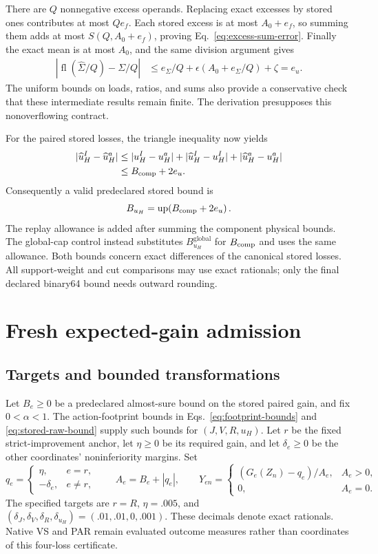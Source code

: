 \documentclass[11pt]{article}
\newcommand{\up}{\operatorname{up}}
\begin{document}
There are $Q$ nonnegative excess operands. Replacing exact excesses by stored ones contributes at most $Qe_f$. Each stored excess is at most $A_0+e_f$, so summing them adds at most $S(Q,A_0+e_f)$, proving Eq.~\eqref{eq:excess-sum-error}. Finally the exact mean is at most $A_0$, and the same division argument gives
\begin{align}
 |\operatorname{fl}(\widehat\Sigma/Q)-\Sigma/Q|
 &\le e_\Sigma/Q+\epsilon(A_0+e_\Sigma/Q)+\zeta=e_u.
\end{align}
The uniform bounds on loads, ratios, and sums also provide a conservative check that these intermediate results remain finite. The derivation presupposes this nonoverflowing contract.

For the paired stored losses, the triangle inequality now yields
\begin{align}
 |\widehat u_H^I-\widehat u_H^a|
 &\le |u_H^I-u_H^a|+|\widehat u_H^I-u_H^I|+|\widehat u_H^a-u_H^a|\\
 &\le B_{\rm comp}+2e_u.
\end{align}
Consequently a valid predeclared stored bound is
\begin{equation}
 B_{u_H}=\up\!\left(B_{\rm comp}+2e_u\right).
 \label{eq:stored-raw-bound}
\end{equation}
The replay allowance is added after summing the component physical bounds. The global-cap control instead substitutes $B_{u_H}^{\mathrm{global}}$ for $B_{\rm comp}$ and uses the same allowance. Both bounds concern exact differences of the canonical stored losses. All support-weight and cut comparisons may use exact rationals; only the final declared binary64 bound needs outward rounding.

\section{Fresh expected-gain admission}
\subsection{Targets and bounded transformations}
Let $B_e\ge0$ be a predeclared almost-sure bound on the stored paired gain, and fix $0<\alpha<1$. The action-footprint bounds in Eqs.~\eqref{eq:footprint-bounds} and \eqref{eq:stored-raw-bound} supply such bounds for $(J,V,R,u_H)$. Let $r$ be the fixed strict-improvement anchor, let $\eta\ge0$ be its required gain, and let $\delta_e\ge0$ be the other coordinates' noninferiority margins. Set
\begin{equation}
 q_e=\begin{cases}\eta,&e=r,\\-\delta_e,&e\ne r,\end{cases}
 \qquad A_e=B_e+|q_e|,\qquad
 Y_{en}=\begin{cases}(G_e(Z_n)-q_e)/A_e,&A_e>0,\\0,&A_e=0.\end{cases}
 \label{eq:transform}
\end{equation}
The specified targets are $r=R$, $\eta=.005$, and $(\delta_J,\delta_V,\delta_R,\delta_{u_H})=(.01,.01,0,.001)$. These decimals denote exact rationals. Native VS and PAR remain evaluated outcome measures rather than coordinates of this four-loss certificate.
\end{document}
